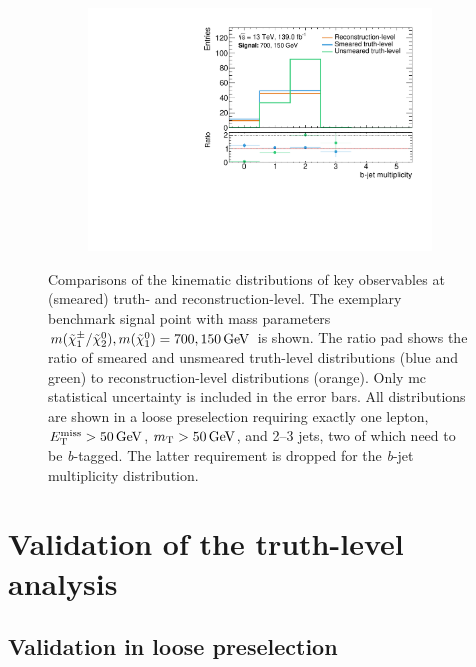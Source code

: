 \begin{figure}
\begin{subfigure}[b]{0.47\linewidth}
		\centering\includegraphics[width=\textwidth]{20210324/700_150/nBJet30_C1N2_Wh_hbb_700p0_150p0_smeared.pdf}
	\end{subfigure}\hfill
	\caption{Comparisons of the kinematic distributions of key observables at (smeared) truth- and reconstruction-level. The exemplary benchmark signal point with mass parameters $m(\charg/\neutr), m(\lsp) = 700, \SI{150}{\GeV}$ is shown. The ratio pad shows the ratio of smeared and unsmeared truth-level distributions (blue and green) to reconstruction-level distributions (orange). Only \gls{mc} statistical uncertainty is included in the error bars. All distributions are shown in a loose preselection requiring exactly one lepton, $\met>\SI{50}{\GeV}$, $\mt > \SI{50}{\GeV}$, and 2--3 jets, two of which need to be \textit{b}-tagged. The latter requirement is dropped for the \textit{b}-jet multiplicity distribution.}
	\label{fig:smearing_preselection}
\end{figure}
 
\section{Validation of the truth-level analysis}

\subsection{Validation in loose preselection}

